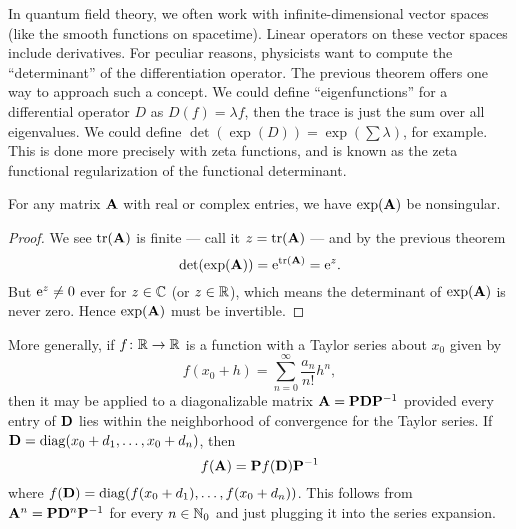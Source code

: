 \begin{remark}
In quantum field theory, we often work with infinite-dimensional vector
spaces (like the smooth functions on spacetime). Linear operators on
these vector spaces include derivatives. For peculiar reasons,
physicists want to compute the ``determinant'' of the differentiation
operator. The previous theorem offers one way to approach such a
concept. We could define ``eigenfunctions'' for a differential operator
$D$ as $D(f)=\lambda f$, then the trace is just the sum over all eigenvalues.
We could define $\det(\exp(D))=\exp(\sum\lambda)$, for example. This is
done more precisely with zeta functions, and is known as the zeta
functional regularization of the functional determinant.
\end{remark}

\begin{corollary}
  For any matrix $\mathbf{A}$ with real or complex entries,
  we have $\exp(\mathbf{A})$ be nonsingular.
\end{corollary}

\begin{proof}
We see $\mathop{\rm tr}\nolimits(\mathbf{A})$ is finite --- call it $z=\mathop{\rm tr}\nolimits(\mathbf{A})$ --- and
by the previous theorem
\begin{equation}
\det(\exp(\mathbf{A})) = \mathrm{e}^{\mathop{\rm tr}\nolimits(\mathbf{A})} = \mathrm{e}^{z}.
\end{equation}
But $\mathrm{e}^{z}\neq0$ ever for $z\in\mathbb{C}$ (or $z\in\mathbb{R}$), which means the
determinant of $\exp(\mathbf{A})$ is never zero. Hence $\exp(\mathbf{A})$ must
be invertible.
\end{proof}

More generally, if $f\colon\mathbb{R}\to\mathbb{R}$ is a function with a Taylor series about $x_{0}$
given by
\begin{equation}
f(x_{0}+h)=\sum^{\infty}_{n=0}\frac{a_{n}}{n!}h^{n},
\end{equation}
then it may be applied to a diagonalizable matrix
$\mathbf{A}=\mathbf{P}\mathbf{D}\mathbf{P}^{-1}$ provided every entry of $\mathbf{D}$
lies within the neighborhood of convergence for the Taylor series. If
$\mathbf{D} = \operatorname{diag}(x_{0} + d_{1}, \dots, x_{0} + d_{n})$, then
\begin{equation}
f(\mathbf{A}) = \mathbf{P}f(\mathbf{D})\mathbf{P}^{-1}
\end{equation}
where $f(\mathbf{D}) = \operatorname{diag}(f(x_{0} + d_{1}), \dots, f(x_{0}+d_{n}))$.
This follows from $\mathbf{A}^{n}=\mathbf{P}\mathbf{D}^{n}\mathbf{P}^{-1}$ for every
$n\in\mathbb{N}_{0}$ and just plugging it into the series expansion.